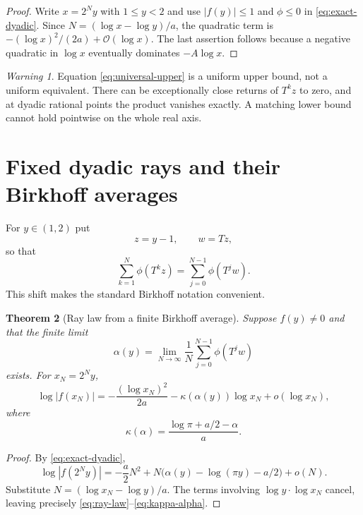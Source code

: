 \documentclass[11pt,oneside]{article}
\newtheorem{theorem}{Theorem}[section]
\theoremstyle{definition}
\theoremstyle{remark}
\newtheorem{warning}[theorem]{Warning}
\newcommand{\bigO}{\mathcal O}
\newcommand{\smallo}{o}
\newcommand{\T}{T}
\begin{document}
\begin{proof}
Write $x=2^Ny$ with $1\le y<2$ and use
$|f(y)|\le1$ and $\phi\le0$ in \eqref{eq:exact-dyadic}.  Since
$N=(\log x-\log y)/a$, the quadratic term is
$-(\log x)^2/(2a)+\bigO(\log x)$.  The last assertion follows because a
negative quadratic in $\log x$ eventually dominates $-A\log x$.
\end{proof}

\begin{warning}
Equation \eqref{eq:universal-upper} is a uniform upper bound, not a uniform
equivalent.  There can be exceptionally close returns of $\T^kz$ to zero, and
at dyadic rational points the product vanishes exactly.  A matching lower bound
cannot hold pointwise on the whole real axis.
\end{warning}

\section{Fixed dyadic rays and their Birkhoff averages}

For $y\in(1,2)$ put
\[
 z=y-1,\qquad w=\T z,
\]
so that
\[
 \sum_{k=1}^{N}\phi(\T^kz)
 =\sum_{j=0}^{N-1}\phi(\T^jw).
\]
This shift makes the standard Birkhoff notation convenient.

\begin{theorem}[Ray law from a finite Birkhoff average]
Suppose $f(y)\ne0$ and that the finite limit
\begin{equation}
 \alpha(y)=\lim_{N\to\infty}\frac1N
 \sum_{j=0}^{N-1}\phi(\T^jw)                               \label{eq:alpha-def}
\end{equation}
exists.  For $x_N=2^Ny$,
\begin{equation}
 \log|f(x_N)|
 =-\frac{(\log x_N)^2}{2a}
  -\kappa(\alpha(y))\log x_N+\smallo(\log x_N),            \label{eq:ray-law}
\end{equation}
where
\begin{equation}
 \kappa(\alpha)=\frac{\log\pi+a/2-\alpha}{a}.              \label{eq:kappa-alpha}
\end{equation}
\end{theorem}

\begin{proof}
By \eqref{eq:exact-dyadic},
\[
 \log|f(2^Ny)|
 =-\frac a2N^2+
 N\bigl(\alpha(y)-\log(\pi y)-a/2\bigr)+\smallo(N).
\]
Substitute $N=(\log x_N-\log y)/a$.  The terms involving
$\log y\cdot\log x_N$ cancel, leaving precisely
\eqref{eq:ray-law}--\eqref{eq:kappa-alpha}.
\end{proof}
\end{document}
